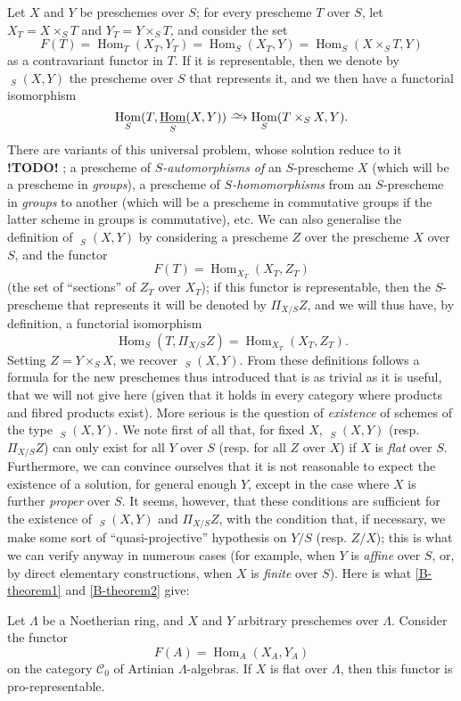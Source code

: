 \documentclass{article}
\theoremstyle{plain}
\newenvironment{proposition}[1]
  {\renewcommand\theinnercustomproposition{#1}\innercustomproposition}
  {\endinnercustomproposition}
\theoremstyle{definition}
\newcommand{\cat}[1]{{\mathcal{#1}}}
\newcommand{\simto}{\xrightarrow{\raisebox{-0.7ex}[0ex][0ex]{$\sim$}}}
\DeclareMathOperator{\Hom}{Hom}
\DeclareMathOperator{\shHom}{\underline{\Hom}}
\newcommand{\todo}{\textbf{ !TODO! }}
\newcommand{\oldpage}[1]{\marginpar{\footnotesize$\Big\vert$ \textit{p.~#1}}}
\begin{document}
Let $X$ and $Y$ be preschemes over $S$;
for every prescheme $T$ over $S$,
\oldpage{195-13}
let $X_T=X\times_S T$ and $Y_T=Y\times_S T$, and consider the set
\[
  F(T)
  = \Hom_T(X_T,Y_T)
  = \Hom_S(X_T,Y)
  = \Hom_S(X\times_S T,Y)
\]
as a contravariant functor in $T$.
If it is representable, then we denote by $\shHom_S(X,Y)$ the prescheme over $S$ that represents it, and we then have a functorial isomorphism
\[
  \Hom_S(T,\shHom_S(X,Y)) \simto \Hom_S(T\times_S X,Y).
\]
There are variants of this universal problem, whose solution reduce to it \todo ; a prescheme of \emph{$S$-automorphisms of} an $S$-prescheme $X$ (which will be a prescheme in \emph{groups}), a prescheme of \emph{$S$-homomorphisms} from an $S$-prescheme in \emph{groups} to another (which will be a prescheme in commutative groups if the latter scheme in groups is commutative), etc.
We can also generalise the definition of $\shHom_S(X,Y)$ by considering a prescheme $Z$ over the prescheme $X$ over $S$, and the functor
\[
  F(T) = \Hom_{X_T}(X_T,Z_T)
\]
(the set of ``sections'' of $Z_T$ over $X_T$);
if this functor is representable, then the $S$-prescheme that represents it will be denoted by $\Pi_{X/S}Z$, and we will thus have, by definition, a functorial isomorphism
\[
  \Hom_S(T,\Pi_{X/S}Z) = \Hom_{X_T}(X_T,Z_T).
\]
Setting $Z=Y\times_S X$, we recover $\shHom_S(X,Y)$.
From these definitions follows a formula for the new preschemes thus introduced that is as trivial as it is useful, that we will not give here (given that it holds in every category where products and fibred products exist).
More serious is the question of \emph{existence} of schemes of the type $\shHom_S(X,Y)$.
We note first of all that, for fixed $X$, $\shHom_S(X,Y)$ (resp. $\Pi_{X/S}Z$) can only exist for all $Y$ over $S$ (resp. for all $Z$ over $X$) if $X$ is \emph{flat} over $S$.
Furthermore, we can convince ourselves that it is not reasonable to expect the existence of a solution, for general enough $Y$, except in the case where $X$ is further \emph{proper} over $S$.
It seems, however, that these conditions are sufficient for the existence of $\shHom_S(X,Y)$ and $\Pi_{X/S}Z$, with the condition that, if necessary, we make some sort of ``quasi-projective'' hypothesis on $Y/S$ (resp. $Z/X$);
this is what we can verify anyway in numerous cases (for example, when $Y$ is \emph{affine} over $S$, or, by direct elementary constructions, when $X$ is \emph{finite} over $S$).
Here is what \cref{B-theorem1} and \cref{B-theorem2} give:

\oldpage{195-14}
\begin{proposition}{2.1}
\label{C.2-proposition1}
  Let $\Lambda$ be a Noetherian ring, and $X$ and $Y$ arbitrary preschemes over $\Lambda$.
  Consider the functor
  \[
    F(A) = \Hom_A(X_A,Y_A)
  \]
  on the category $\cat{C}_0$ of Artinian $\Lambda$-algebras.
  If $X$ is flat over $\Lambda$, then this functor is pro-representable.
\end{proposition}
\end{document}
